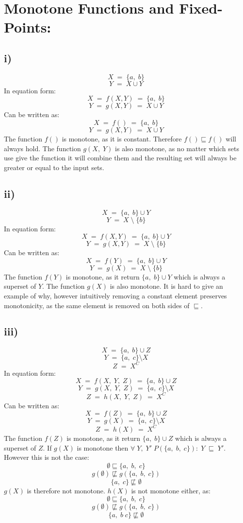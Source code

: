 \documentclass{article}
\begin{document}
\section*{Monotone Functions and Fixed-Points:}

\subsection*{i)}
$$X\;=\;\{a,\;b\}$$
$$Y\;=\;X\cup Y$$
In equation form:
$$X\;=\;f(X, Y)\;=\;\{a,\;b\}$$
$$Y\;=\;g(X, Y)\;=\;X\cup Y$$
Can be written as:
$$X\;=\;f()\;=\;\{a,\;b\}$$
$$Y\;=\;g(X, Y)\;=\;X\cup Y$$
The function $f()$ is monotone, as it is constant. Therefore $f() \sqsubseteq f()$ will always hold. The function $g(X,\;Y)$ is also monotone, as no matter which sets use give the function it will combine them and the resulting set will always be greater or equal to the input sets.

\subsection*{ii)}
$$X\;=\;\{a,\;b\}\cup Y$$
$$Y\;=\;X\;\setminus\;\{b\}$$
In equation form:
$$X\;=\;f(X, Y)\;=\;\{a,\;b\}\cup Y$$
$$Y\;=\;g(X, Y)\;=\;X\;\setminus\;\{b\}$$
Can be written as:
$$X\;=\;f(Y)\;=\;\{a,\;b\}\cup Y$$
$$Y\;=\;g(X)\;=\;X\;\setminus\;\{b\}$$
The function $f(Y)$ is monotone, as it return $\{a,\;b\}\cup Y$ which is always a superset of $Y$. The function $g(X)$ is also monotone. It is hard to give an example of why, however intuitively removing a constant element preserves monotonicity, as the same element is removed on both sides of $\sqsubseteq$.
\subsection*{iii)}
$$X\;=\;\{a,\;b\}\cup Z$$
$$Y\;=\;\{a,\;c\}\setminus X$$
$$Z\;=\;X^C$$
In equation form:
$$X\;=\;f(X,\;Y,\;Z)\;=\;\{a,\;b\}\cup Z$$
$$Y\;=\;g(X,\;Y,\;Z)\;=\;\{a,\;c\}\setminus X$$
$$Z\;=\;h(X,\;Y,\;Z)\;=\;X^C$$
Can be written as:
$$X\;=\;f(Z)\;=\;\{a,\;b\}\cup Z$$
$$Y\;=\;g(X)\;=\;\{a,\;c\}\setminus X$$
$$Z\;=\;h(X)\;=\;X^C$$
The function $f(Z)$ is monotone, as it return $\{a,\;b\}\cup Z$ which is always a superset of $Z$. If $g(X)$ is monotone then $\forall\;Y,\;Y'\;P(\{a,\;b,\;c\}):\;Y\;\sqsubseteq\;Y'$. However this is not the case:
$$\emptyset\sqsubseteq \{a,\;b,\;c\}$$
$$g(\emptyset)\not\sqsubseteq g(\{a,\;b,\;c\})$$
$$\{a,\;c\}\not\sqsubseteq \emptyset$$
$g(X)$ is therefore not monotone. $h(X)$ is not monotone either, as:
$$\emptyset\sqsubseteq \{a,\;b,\;c\}$$
$$g(\emptyset)\not\sqsubseteq g(\{a,\;b,\;c\})$$
$$\{a,\;b\;c\}\not\sqsubseteq \emptyset$$
\end{document}
